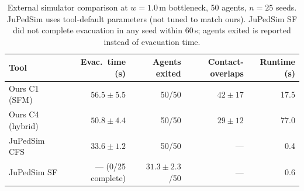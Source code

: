 \begin{table}[h]
\caption{External simulator comparison at $w=1.0$\,m bottleneck, 50 agents, $n=25$ seeds. JuPedSim uses tool-default parameters (not tuned to match ours). JuPedSim SF did not complete evacuation in any seed within 60\,s; agents exited is reported instead of evacuation time.}\label{tab:external}
\centering\scriptsize
\begin{tabular}{@{}lrrrr@{}}
\toprule
\textbf{Tool} & \textbf{Evac.\ time (s)} & \textbf{Agents exited} & \textbf{Contact-overlaps} & \textbf{Runtime (s)} \\
\midrule
Ours C1 (SFM) & $56.5 \pm 5.5$ & 50/50 & $42 \pm 17$ & 17.5 \\
Ours C4 (hybrid) & $50.8 \pm 4.4$ & 50/50 & $29 \pm 12$ & 77.0 \\
JuPedSim CFS & $33.6 \pm 1.2$ & 50/50 & --- & 0.4 \\
JuPedSim SF & --- (0/25 complete) & $31.3 \pm 2.3$/50 & --- & 0.6 \\
\bottomrule
\end{tabular}
\end{table}
